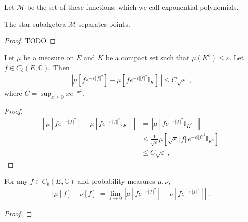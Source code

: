 Let $\mathcal M$ be the set of these functions, which we call exponential polynomials.

\begin{lemma}\label{lem:separating_expPoly}
 \leanok
{}
The star-subalgebra $\mathcal M$ separates points.
\end{lemma}

\begin{proof}
TODO
\end{proof}

\begin{lemma}\label{lem:integral_restrict_compact}
Let $\mu$ be a measure on $E$ and $K$ be a compact set such that $\mu(K^c) \le \varepsilon$. Let $f \in C_b(E, \mathbb{C})$. Then
\begin{align*}
\left\Vert \mu[fe^{-\varepsilon \Vert f \Vert^2}] - \mu[f e^{-\varepsilon \Vert f \Vert^2} \mathbb{I}_K] \right\Vert
\le C \sqrt{\varepsilon} \: ,
\end{align*}
where $C = \sup_{x \ge 0} x e^{-x^2}$.
\end{lemma}

\begin{proof}
\begin{align*}
\left\Vert \mu[fe^{-\varepsilon \Vert f \Vert^2}] - \mu[f e^{-\varepsilon \Vert f \Vert^2} \mathbb{I}_K] \right\Vert
&= \left\Vert \mu[f e^{-\varepsilon \Vert f \Vert^2} \mathbb{I}_{K^c}] \right\Vert
\\
&\le \frac{1}{\sqrt{\varepsilon}} \mu \left[ \sqrt{\varepsilon} \Vert f \Vert e^{-\varepsilon \Vert f \Vert^2} \mathbb{I}_{K^c} \right]
\\
&\le C \sqrt{\varepsilon} \: ,
\end{align*}
\end{proof}

\begin{lemma}\label{lem:introduce_exponential}
For any $f \in C_b(E, \mathbb{C})$ and probability measures $\mu, \nu$,
\begin{align*}
\left\vert \mu[f] - \nu[f] \right\vert
= \lim_{\varepsilon \to 0} \left\vert \mu\left[f e^{-\varepsilon \Vert f \Vert^2} \right] - \nu\left[f e^{-\varepsilon \Vert f \Vert^2} \right] \right\vert
\: .
\end{align*}
\end{lemma}

\begin{proof}
\end{proof}

